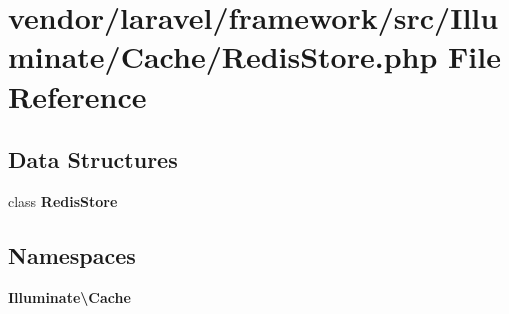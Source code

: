 \section{vendor/laravel/framework/src/\+Illuminate/\+Cache/\+Redis\+Store.php File Reference}
\label{_redis_store_8php}
\subsection*{Data Structures}
\begin{DoxyCompactItemize}
\item 
class {\bf Redis\+Store}
\end{DoxyCompactItemize}
\subsection*{Namespaces}
\begin{DoxyCompactItemize}
\item 
 {\bf Illuminate\textbackslash{}\+Cache}
\end{DoxyCompactItemize}
